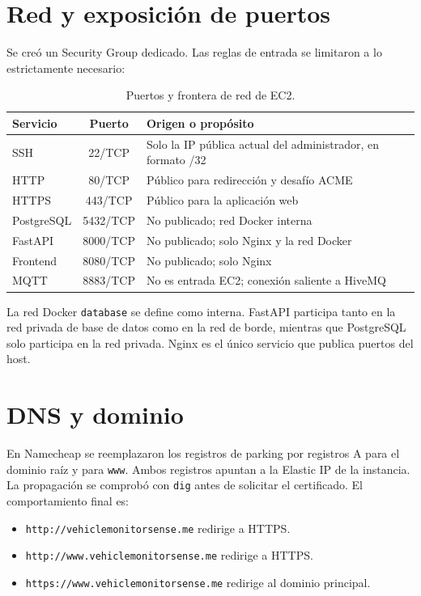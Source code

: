 \documentclass[12pt,a4paper,oneside]{report}
\newcommand{\code}[1]{\texttt{\small #1}}
\begin{document}
\section{Red y exposición de puertos}

Se creó un Security Group dedicado. Las reglas de entrada se limitaron a lo
estrictamente necesario:

\begin{table}[ht]
\centering
\small
\begin{tabularx}{0.9\textwidth}{l c X}
\toprule
Servicio & Puerto & Origen o propósito \\
\midrule
SSH & 22/TCP & Solo la IP pública actual del administrador, en formato /32 \\
HTTP & 80/TCP & Público para redirección y desafío ACME \\
HTTPS & 443/TCP & Público para la aplicación web \\
\midrule
PostgreSQL & 5432/TCP & No publicado; red Docker interna \\
FastAPI & 8000/TCP & No publicado; solo Nginx y la red Docker \\
Frontend & 8080/TCP & No publicado; solo Nginx \\
MQTT & 8883/TCP & No es entrada EC2; conexión saliente a HiveMQ \\
\bottomrule
\end{tabularx}
\caption{Puertos y frontera de red de EC2.}
\end{table}

La red Docker \code{database} se define como interna. FastAPI participa tanto en
la red privada de base de datos como en la red de borde, mientras que PostgreSQL
solo participa en la red privada. Nginx es el único servicio que publica puertos
del host.

\section{DNS y dominio}

En Namecheap se reemplazaron los registros de parking por registros A para el
dominio raíz y para \code{www}. Ambos registros apuntan a la Elastic IP de la
instancia. La propagación se comprobó con \code{dig} antes de solicitar el
certificado. El comportamiento final es:

\begin{itemize}
  \item \code{http://vehiclemonitorsense.me} redirige a HTTPS.
  \item \code{http://www.vehiclemonitorsense.me} redirige a HTTPS.
  \item \code{https://www.vehiclemonitorsense.me} redirige al dominio principal.
\end{itemize}
\end{document}
